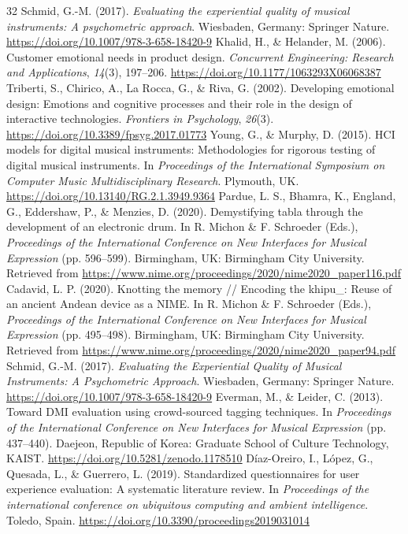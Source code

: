 \documentclass[sigconf]{nimeart}
\begin{document}
\begin{thebibliography}{32}
 {{ }}  Schmid, G.-M. (2017). \emph{Evaluating the experiential quality of musical instruments: A psychometric approach}. Wiesbaden, Germany: Springer Nature. \url{https://doi.org/10.1007/978-3-658-18420-9}{}
 {{ }}  Khalid, H., \& Helander, M. (2006). Customer emotional needs in product design. \emph{Concurrent Engineering: Research and Applications}, \emph{14}(3), 197--206. \url{https://doi.org/10.1177/1063293X06068387}{}
 {{ }}  Triberti, S., Chirico, A., La Rocca, G., \& Riva, G. (2002). Developing emotional design: Emotions and cognitive processes and their role in the design of interactive technologies. \emph{Frontiers in Psychology}, \emph{26}(3). \url{https://doi.org/10.3389/fpsyg.2017.01773}{}
 {{ }}  Young, G., \& Murphy, D. (2015). HCI models for digital musical instruments: Methodologies for rigorous testing of digital musical instruments. In \emph{Proceedings of the International Symposium on Computer Music Multidisciplinary Research}. Plymouth, UK. \url{https://doi.org/10.13140/RG.2.1.3949.9364}{}
 {{ }}  Pardue, L. S., Bhamra, K., England, G., Eddershaw, P., \& Menzies, D. (2020). Demystifying tabla through the development of an electronic drum. In R. Michon \& F. Schroeder (Eds.), \emph{Proceedings of the International Conference on New Interfaces for Musical Expression} (pp. 596--599). Birmingham, UK: Birmingham City University. Retrieved from \url{https://www.nime.org/proceedings/2020/nime2020_paper116.pdf}{}
 {{ }}  Cadavid, L. P. (2020). Knotting the memory // Encoding the khipu\_: Reuse of an ancient Andean device as a NIME. In R. Michon \& F. Schroeder (Eds.), \emph{Proceedings of the International Conference on New Interfaces for Musical Expression} (pp. 495--498). Birmingham, UK: Birmingham City University. Retrieved from \url{https://www.nime.org/proceedings/2020/nime2020_paper94.pdf}{}
 {{ }}  Schmid, G.-M. (2017). \emph{Evaluating the Experiential Quality of Musical Instruments: A Psychometric Approach}. Wiesbaden, Germany: Springer Nature. \url{https://doi.org/10.1007/978-3-658-18420-9}{}
 {{ }}  Everman, M., \& Leider, C. (2013). Toward DMI evaluation using crowd-sourced tagging techniques. In \emph{Proceedings of the International Conference on New Interfaces for Musical Expression} (pp. 437--440). Daejeon, Republic of Korea: Graduate School of Culture Technology, KAIST. \url{https://doi.org/10.5281/zenodo.1178510}{}
 {{ }}  Díaz-Oreiro, I., López, G., Quesada, L., \& Guerrero, L. (2019). Standardized questionnaires for user experience evaluation: A systematic literature review. In \emph{Proceedings of the international conference on ubiquitous computing and ambient intelligence}. Toledo, Spain. \url{https://doi.org/10.3390/proceedings2019031014}{}

\end{thebibliography}
\end{document}
